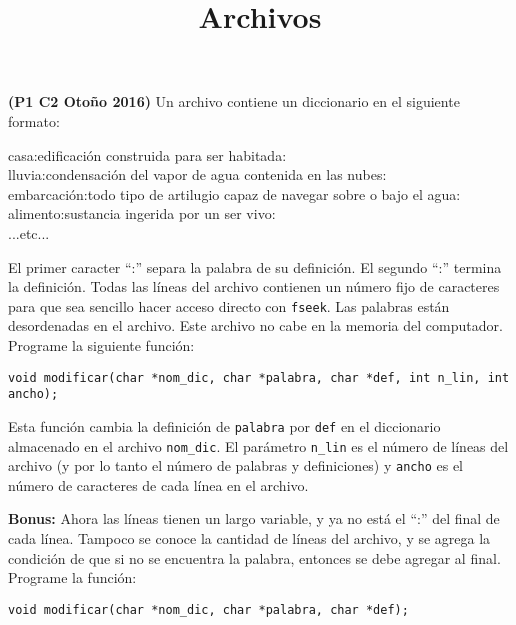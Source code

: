 \documentclass[dcc]{fcfmcourse}
\title[6]{Archivos}
\begin{document}
\maketitle

\begin{problems}
\problem \textbf{(P1 C2 Otoño 2016)}
Un archivo contiene un diccionario en el siguiente formato:

\begin{center}
\begin{minipage}{0.8\textwidth}
\begin{framed}
  casa:edificación construida para ser habitada:\\
  lluvia:condensación del vapor de agua contenida en las nubes:\\
  embarcación:todo tipo de artilugio capaz de navegar sobre o bajo el agua:\\
  alimento:sustancia ingerida por un ser vivo:\\
  ...etc...
\end{framed}
\end{minipage}
\end{center}

El primer caracter ``:'' separa la palabra de su definición. El segundo ``:'' termina la definición. Todas las líneas del archivo contienen un número fijo de caracteres para que sea sencillo hacer acceso directo con \texttt{fseek}. Las palabras están desordenadas en el archivo. Este archivo no cabe en la memoria del computador. Programe la siguiente función:

\begin{center}
  \texttt{void modificar(char *nom\_dic, char *palabra, char *def, int n\_lin, int ancho);}
\end{center}

Esta función cambia la definición de \texttt{palabra} por \texttt{def} en el diccionario almacenado en el archivo \texttt{nom\_dic}. El parámetro \texttt{n\_lin} es el número de líneas del archivo (y por lo tanto el número de palabras y definiciones) y \texttt{ancho} es el número de caracteres de cada línea en el archivo.

\textbf{Bonus:} Ahora las líneas tienen un largo variable, y ya no está el ``:'' del final de cada línea. Tampoco se conoce la cantidad de líneas del archivo, y se agrega la condición de que si no se encuentra la palabra, entonces se debe agregar al final. Programe la función:

\begin{center}
  \texttt{void modificar(char *nom\_dic, char *palabra, char *def);}
\end{center}

\end{problems}
\end{document}
